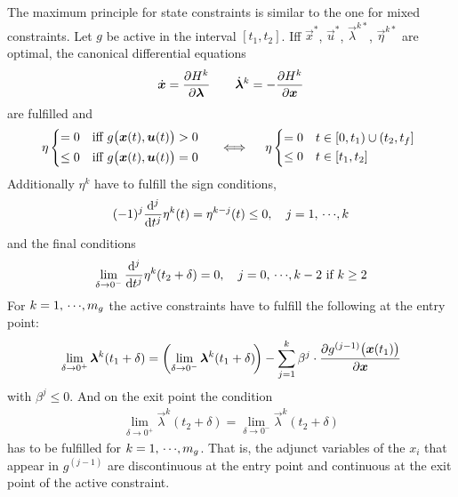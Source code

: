 				The maximum principle for state constraints is similar to the one for mixed constraints. Let \(g\) be active in the interval \( [t_1, t_2] \). Iff \( \vec{x}^\ast \), \( \vec{u}^\ast \), \( \vec{\lambda}^{k\ast} \), \( \vec{\eta}^{k\ast} \) are optimal, the canonical differential equations
				\begin{align*}
					\dot{\bm{x}} = \pdv{H^k}{\bm{\lambda}} \qquad \dot{\bm{\lambda}}^k = -\pdv{H^k}{\bm{x}}
				\end{align*}
				are fulfilled and
				\begin{align*}
					\eta
					\begin{cases*}
						= 0    & iff \( g\big(\vec{x}(t), \vec{u}(t)\big) > 0 \) \\
						\leq 0 & iff \( g\big(\vec{x}(t), \vec{u}(t)\big) = 0 \)
					\end{cases*}
					\quad\iff\quad
					\eta
					\begin{cases*}
						= 0    & \( t \in [0, t_1) \cup (t_2, t_f] \) \\
						\leq 0 & \( t \in [t_1, t_2] \)
					\end{cases*}
				\end{align*}
				Additionally \(\eta^k\) have to fulfill the sign conditions,
				\begin{align*}
					(-1)^j \dv[j]{t} \eta^k(t) = \eta^{k - j}(t) \leq 0,\quad j = 1,\,\cdots\!,k
				\end{align*}
				and the final conditions
				\begin{align*}
					\lim\limits_{\delta \to 0^-} \dv[j]{t} \eta^k(t_2 + \delta) = 0,\quad j = 0,\,\cdots\!,k - 2 \text{ if } k \geq 2
				\end{align*}
				For \( k = 1,\,\cdots\!,m_g \) the active constraints have to fulfill the following at the entry point:
				\begin{align*}
					\lim\limits_{\delta \to 0^+} \bm{\lambda}^k(t_1 + \delta) = \bigg(\! \lim\limits_{\delta \to 0^-} \bm{\lambda}^k(t_1 + \delta) \!\bigg) - \sum_{j = 1}^{k} \beta^j \cdot \pdv{g^{(j - 1)}\big(\bm{x}(t_1)\big)}{\bm{x}}
				\end{align*}
				with \( \beta^j \leq 0 \). And on the exit point the condition
				\begin{align*}
					\lim\limits_{\delta \to 0^+} \vec{\lambda}^k(t_2 + \delta) = \lim\limits_{\delta \to 0^-} \vec{\lambda}^k(t_2 + \delta)
				\end{align*}
				has to be fulfilled for \( k = 1,\,\cdots\!,m_g \). That is, the adjunct variables of the \(x_i\) that appear in \( g^{(j - 1)} \) are discontinuous at the entry point and continuous at the exit point of the active constraint.

